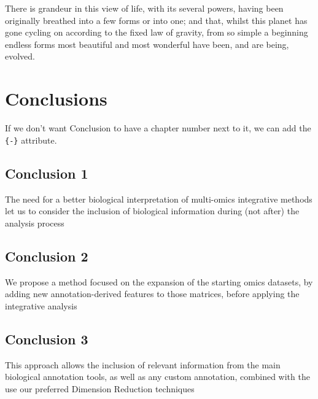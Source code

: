 \documentclass[a4paper, nobind]{templates/ociamthesis}
\renewcommand{\chaptermark}[1]{\markboth{\thechapter. #1}{\thechapter. #1}}
\begin{document}
\begin{savequote}
There is grandeur in this view of life, with its several powers, having
been originally breathed into a few forms or into one; and that, whilst
this planet has gone cycling on according to the fixed law of gravity,
from so simple a beginning endless forms most beautiful and most
wonderful have been, and are being, evolved.
\end{savequote}



\hypertarget{conclusions}{%
\chapter{Conclusions}\label{conclusions}}

\chaptermark{Conclusions}

If we don't want Conclusion to have a chapter number next to it, we can add the \texttt{\{-\}} attribute.

\hypertarget{conclusion-1}{%
\section*{Conclusion 1}\label{conclusion-1}}

The need for a better biological interpretation of multi-omics integrative methods let us to consider the inclusion of biological information during (not after) the analysis process

\hypertarget{conclusion-2}{%
\section*{Conclusion 2}\label{conclusion-2}}

We propose a method focused on the expansion of the starting omics datasets, by adding new annotation-derived features to those matrices, before applying the integrative analysis

\hypertarget{conclusion-3}{%
\section*{Conclusion 3}\label{conclusion-3}}

This approach allows the inclusion of relevant information from the main biological annotation tools, as well as any custom annotation, combined with the use our preferred Dimension Reduction techniques
\end{document}
